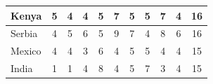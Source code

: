 \documentclass[12pt]{article}  %
\begin{document}
\begin{subappendices}
\begin{longtable}{|l|c|c|c|c|c|c|c|c|c|c|}
	\hline
	Kenya                                                          & 5                                                                      & 4                                                                      & 4                                                                      & 5                                                                      & 7                                                                      & 5                                                                      & 5                         & 7                           & 4                           & 16                          \\ 
	\hline
	Serbia                                                         & 4                                                                      & 5                                                                      & 6                                                                      & 5                                                                      & 9                                                                      & 7                                                                      & 4                         & 8                           & 6                           & 16                          \\ 
	\hline
	Mexico                                                         & 4                                                                      & 4                                                                      & 3                                                                      & 6                                                                      & 4                                                                      & 5                                                                      & 5                         & 4                           & 4                           & 15                          \\ 
	\hline
	India                                                          & 1                                                                      & 1                                                                      & 4                                                                      & 8                                                                      & 4                                                                      & 5                                                                      & 7                         & 3                           & 4                           & 15                          \\ 

\end{longtable}
\end{subappendices}
\end{document}
